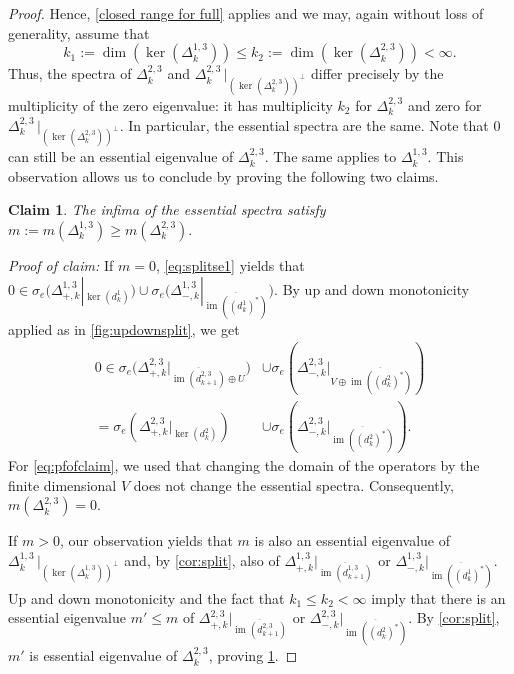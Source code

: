 \documentclass[11pt]{article}
\newtheorem{claim}{Claim}[theorem]
\theoremstyle{definition}
\theoremstyle{remark}
\DeclareMathOperator{\im}{im}
\begin{document}
\begin{proof}
         Hence, \cref{closed range for full} applies and we may, again without loss of generality, assume that $$k_1:= \dim(\ker(\Delta_k^{1,3})) \le k_2:=\dim(\ker(\Delta_k^{2,3})) < \infty.$$         
        Thus, the spectra of $\Delta_k^{2,3}$ and $\Delta_k^{2,3}\, |_{(\ker(\Delta_k^{2,3}))^\perp}$ differ precisely by the multiplicity of the zero eigenvalue: it has multiplicity $k_2$ for $\Delta_k^{2,3}$ and zero for $\Delta_k^{2,3}\, |_{(\ker(\Delta_k^{2,3}))^\perp}$. In particular, the essential spectra are the same. Note that $0$ can still be an essential eigenvalue of $\Delta_k^{2,3}$. The same applies to $\Delta_k^{1,3}$. This observation allows us to conclude by proving the following two claims.
        \begin{claim} \label{claim:split1}
            The infima of the essential spectra satisfy $m:=m(\Delta_k^{1,3}) \ge m(\Delta_k^{2,3}).$
        \end{claim}
        \textit{Proof of claim:} If $m=0$, \cref{eq:splitse1} yields that $0 \in \sigma_e\Big(\Delta_{+,k}^{1,3}|_{\ker(d_k^1)}\Big) \cup \sigma_e\Big(\Delta_{-,k}^{1,3}|_{\overline{\im((d_k^1)^*)}}\Big).$ By up and down monotonicity applied as in \cref{fig:updownsplit}, we get 
        \begin{align}
             0\in \sigma_e \Big( \! \Delta_{+,k}^{2,3}|_{\overline{\im(d_{k+1}^{2,3})}\oplus U}\Big) &\cup \sigma_e \! \left(\! \Delta_{-,k}^{2,3}|_{V \oplus \overline{\im((d_k^2)^*)}}\right) \nonumber \\
             =\sigma_e\! \left(\! \Delta_{+,k}^{2,3}|_{\ker(d_k^2)}\right) &\cup \sigma_e\! \left(\! \Delta_{-,k}^{2,3}|_{\overline{\im((d_k^2)^*)}}\right). \label{eq:pfofclaim}
        \end{align} For \cref{eq:pfofclaim}, we used that changing the domain of the operators by the finite dimensional $V$ does not change the essential spectra. Consequently, $m(\Delta_k^{2,3})=0$.
        
        If $m>0$, our observation yields that $m$ is also an essential eigenvalue of $\Delta_k^{1,3}\, |_{(\ker(\Delta_k^{1,3}))^\perp}$ and, by \cref{cor:split}, also of $\Delta_{+,k}^{1,3}|_{\overline{\im(d_{k+1}^{1,3})}}$ or $\Delta_{-,k}^{1,3}|_{\overline{\im((d_k^1)^*)}}$. Up and down monotonicity and the fact that $k_1\le k_2 <\infty$ imply that there is an essential eigenvalue $m'\le m$ of $\Delta_{+,k}^{2,3}|_{\overline{\im(d_{k+1}^{2,3})}}$ or $\Delta_{-,k}^{2,3}|_{\overline{\im((d_k^2)^*)}}$. By \cref{cor:split}, $m'$ is essential eigenvalue of $\Delta_k^{2,3}$, proving \cref{claim:split1}.
        

\end{proof}
\end{document}

